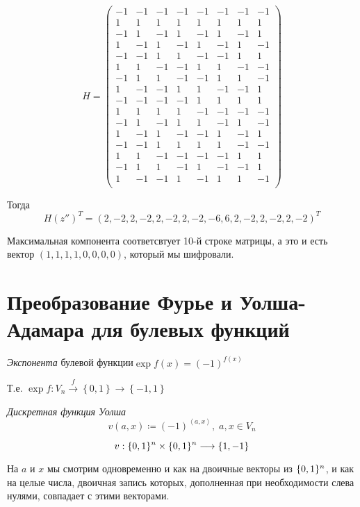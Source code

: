 $$H = \begin{pmatrix}
-1 & -1 & -1 & -1 & -1 & -1 & -1 & -1\\
1 & 1 & 1 & 1 & 1 & 1 & 1 & 1\\
-1 & 1 & -1 & 1 & -1 & 1 & -1 & 1\\
1 & -1 & 1 & -1 & 1 & -1 & 1 & -1\\
-1 & -1 & 1 & 1 & -1 & -1 & 1 & 1\\
1 & 1 & -1 & -1 & 1 & 1 & -1 & -1\\
-1 & 1 & 1 & -1 & -1 & 1 & 1 & -1\\
1 & -1 & -1
 & 1 & 1 & -1 & -1 & 1\\
-1 & -1 & -1 & -1 & 1 & 1 & 1 & 1\\
1 & 1 & 1 & 1 & -1 & -1 & -1 & -1\\
-1 & 1 & -1 & 1 & 1 & -1 & 1 & -1\\
1 & -1 & 1 & -1 & -1 & 1 & -1 & 1\\
-1 & -1 & 1 & 1 & 1 & 1 & -1 & -1\\
1 & 1 & -1 & -1 & -1 & -1 & 1 & 1\\
-1 & 1 & 1 & -1 & 1 & -1 & -1 & 1\\
1 & -1 & -1 & 1 & -1 & 1 & 1 & -1\\
\end{pmatrix}$$

Тогда
$$H (z'')^T = (2, -2, 2, -2, 2, -2, 2, -2, -6, 6, 2, -2, 2, -2, 2, -2)^T$$

Максимальная компонента соответсвтует 10-й строке матрицы, а это и есть вектор $(1,1,1,1,0,0,0,0)$,
который мы шифровали.


\section{Преобразование Фурье и Уолша-Адамара для булевых функций}

\begin{definition}
\emph{Экспонента }булевой функции$\exp f\left(x\right)=\left(-1\right)^{f\left(x\right)}$
\end{definition}
Т.е. $\exp f:V_{n}\stackrel{f}{\longrightarrow}\left\{ 0,1\right\} 
\longrightarrow\left\{ -1,1\right\} $


\begin{definition}
\emph{Дискретная функция Уолша}
\[
v\left(a,x\right)\coloneqq\left(-1\right)^{\left\langle a,x\right\rangle },\; a,x\in V_{n}
\]


\[
v:\{0,1\}^n\times \{0,1\}^n\longrightarrow\left\{ 1,-1\right\} 
\]

\end{definition}
На $a$ и $x$ мы смотрим одновременно и как на двоичные векторы из
$\{0,1\}^n$, и как на целые числа, двоичная запись которых, дополненная
при необходимости слева нулями, совпадает с этими векторами.


